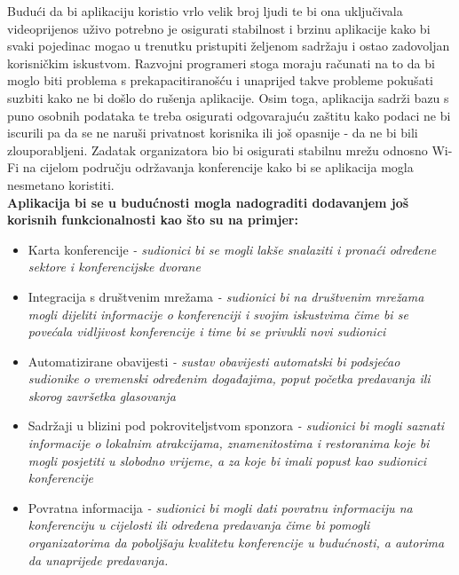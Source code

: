 		Budući da bi aplikaciju koristio vrlo velik broj ljudi te bi ona uključivala videoprijenos uživo potrebno je osigurati stabilnost i brzinu aplikacije kako bi svaki pojedinac mogao u trenutku pristupiti željenom sadržaju i ostao zadovoljan korisničkim iskustvom. Razvojni programeri stoga moraju računati na to da bi moglo biti problema s prekapacitiranošću i unaprijed takve probleme pokušati suzbiti kako ne bi došlo do rušenja aplikacije. Osim toga, aplikacija sadrži bazu s puno osobnih podataka te treba osigurati odgovarajuću zaštitu kako podaci ne bi iscurili pa da se ne naruši privatnost korisnika ili još opasnije - da ne bi bili zlouporabljeni. Zadatak organizatora bio bi osigurati stabilnu mrežu odnosno Wi-Fi na cijelom području održavanja konferencije kako bi se aplikacija mogla nesmetano koristiti.\\
		
		\textbf{Aplikacija bi se u budućnosti mogla nadograditi dodavanjem još korisnih funkcionalnosti kao što su na primjer:}
		\begin{itemize}
			\item Karta konferencije
			\textit{- sudionici bi se mogli lakše snalaziti i pronaći određene sektore i konferencijske dvorane}
			\item Integracija s društvenim mrežama
			\textit{- sudionici bi na društvenim mrežama mogli dijeliti informacije o konferenciji i svojim iskustvima čime bi se povećala vidljivost konferencije i time bi se privukli novi sudionici}
			\item Automatizirane obavijesti
			\textit{- sustav obavijesti automatski bi podsjećao sudionike o vremenski određenim događajima, poput početka predavanja ili skorog završetka glasovanja}
			\item Sadržaji u blizini pod pokroviteljstvom sponzora
			\textit{- sudionici bi mogli saznati informacije o lokalnim atrakcijama, znamenitostima i restoranima koje bi mogli posjetiti u slobodno vrijeme, a za koje bi imali popust kao sudionici konferencije}
			\item Povratna informacija
			\textit{- sudionici bi mogli dati povratnu informaciju na konferenciju u cijelosti ili određena predavanja čime bi pomogli organizatorima da poboljšaju kvalitetu konferencije u budućnosti, a autorima da unaprijede predavanja.}\\
		\end{itemize}
		

